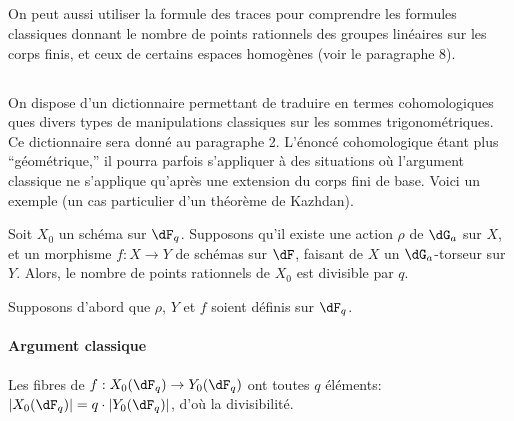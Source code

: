 \subsection{}\label{VI:1-11}

On peut aussi utiliser la formule des traces pour comprendre les formules 
classiques donnant le nombre de points rationnels des groupes lin\'eaires sur 
les corps finis, et ceux de certains espaces homog\`enes (voir le paragraphe 
8). 





\subsection{}\label{VI:1-12}

On dispose d'un dictionnaire permettant de traduire en termes cohomologiques 
ques divers types de manipulations classiques sur les sommes 
trigonom\'etriques. Ce dictionnaire sera donn\'e au paragraphe 2. L'\'enonc\'e 
cohomologique \'etant plus ``g\'eom\'etrique,'' il pourra parfois s'appliquer 
\`a des situations o\`u l'argument classique ne s'applique qu'apr\`es une 
extension du corps fini de base. Voici un exemple (un cas particulier d'un 
th\'eor\`eme de Kazhdan). 





\begin{theorem_}[Kazhdan]\label{VI:1-13}
Soit $X_0$ un sch\'ema sur $\dF_q$. Supposons qu'il existe une action $\rho$ de 
$\dG_a$ sur $X$, et un morphisme $f:X\to Y$ de sch\'emas sur $\dF$, faisant de 
$X$ un $\dG_a$-torseur sur $Y$. Alors, le nombre de points rationnels de $X_0$ 
est divisible par $q$.
\end{theorem_}

Supposons d'abord que $\rho$, $Y$ et $f$ soient d\'efinis sur $\dF_q$. 


\paragraph{Argument classique}
Les fibres de $f:X_0(\dF_q)\to Y_0(\dF_q)$ ont toutes $q$ \'el\'ements: 
$|X_0(\dF_q)| = q\cdot |Y_0(\dF_q)|$, d'o\`u la divisibilit\'e. 



